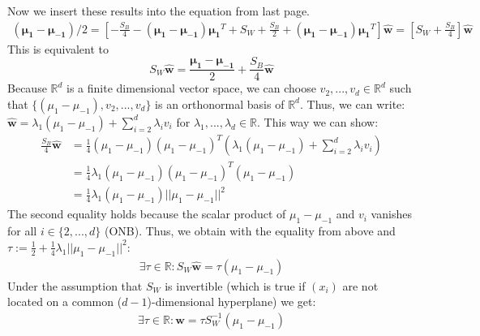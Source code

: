 \documentclass[11pt]{article}
\begin{document}
Now we insert these results into the equation from last page.
\begin{align*}
(\mathbf{\mu_1 - \mu_{-1}})/2 = \left[ - \frac{S_B}{4} - (\mathbf{\mu_{1}-\mu_{-1}})\mathbf{\mu_{1}}^T + S_W + \frac{S_B}{2} + (\mathbf{\mu_{1}-\mu_{-1}})\mathbf{\mu_{1}}^T \right] \mathbf{\hat{w}} = \left[ S_W + \frac{S_B}{4} \right] \mathbf{\hat{w}}
\end{align*}
This is equivalent to
\begin{equation}
S_W \mathbf{\hat{w}} = \frac{\mathbf{\mu_1 - \mu_{-1}}}{2} + \frac{S_B}{4} \mathbf{\hat{w}}
\end{equation}
Because $\mathbb{R}^d$ is a finite dimensional vector space, we can choose $v_2, ...,v_d \in \mathbb{R}^d$ such that $\{(\mu_1-\mu_{-1}),v_2, ..., v_d\}$ is an orthonormal basis of $\mathbb{R}^d$.
Thus, we can write: $\mathbf{\hat{w}} = \lambda_1 (\mu_1-\mu_{-1}) + \sum_{i=2}^d \lambda_i v_i$ for $\lambda_1, ...,\lambda_d  \in \mathbb{R}$. This way we can show:
\begin{align*}
\frac{S_B}{4} \mathbf{\hat{w}} &= \frac{1}{4} (\mu_1-\mu_{-1})(\mu_1-\mu_{-1})^T \left( \lambda_1 (\mu_1-\mu_{-1}) + \sum_{i=2}^d \lambda_i v_i \right)\\
&= \frac{1}{4} \lambda_1 (\mu_1-\mu_{-1})(\mu_1-\mu_{-1})^T(\mu_1-\mu_{-1})\\ 
&= \frac{1}{4} \lambda_1 (\mu_1-\mu_{-1})||\mu_1-\mu_{-1}||^2 
\end{align*}
The second equality holds because the scalar product of $\mu_1-\mu_{-1}$ and $v_i$ vanishes for all $i \in \{2, ...,d\}$ (ONB). Thus, we obtain with the equality from above and $\tau := \frac{1}{2} + \frac{1}{4}\lambda_1 ||\mu_1-\mu_{-1}||^2$:
\begin{align*}
\exists \tau \in \mathbb{R}: S_W\mathbf{\hat{w}} = \tau (\mu_1-\mu_{-1})
\end{align*}  
Under the assumption that $S_W$ is invertible (which is true if $(x_i)$ are not located on a common ($d-1$)-dimensional hyperplane) we get:
\begin{align*}
\exists \tau \in \mathbb{R}: \mathbf{\hat{w}} = \tau S_W^{-1} (\mu_1-\mu_{-1})
\end{align*}
\end{document}
